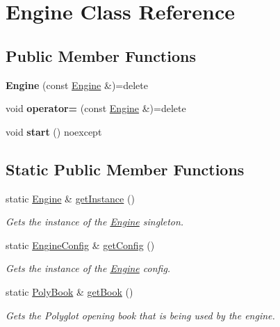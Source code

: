 \hypertarget{classEngine}{}\section{Engine Class Reference}
\label{classEngine}
\subsection*{Public Member Functions}
\begin{DoxyCompactItemize}
\item 
\mbox{\label{classEngine_ab9ee0ddff1237cf61eb482bfce9ab480}} 
{\bfseries Engine} (const \mbox{\hyperlink{classEngine}{Engine}} \&)=delete
\item 
\mbox{\label{classEngine_a5d7e8ec8383567cfe24b2b94c5730729}} 
void {\bfseries operator=} (const \mbox{\hyperlink{classEngine}{Engine}} \&)=delete
\item 
\mbox{\label{classEngine_aa78d58b978bb3c6bb147bc999e9523c1}} 
void {\bfseries start} () noexcept
\end{DoxyCompactItemize}
\subsection*{Static Public Member Functions}
\begin{DoxyCompactItemize}
\item 
static \mbox{\hyperlink{classEngine}{Engine}} \& \mbox{\hyperlink{classEngine_ae174f8fa16fbab1633489283db2b0c9f}{get\+Instance}} ()
\begin{DoxyCompactList}\small\item\em Gets the instance of the \mbox{\hyperlink{classEngine}{Engine}} singleton. \end{DoxyCompactList}\item 
static \mbox{\hyperlink{structEngineConfig}{Engine\+Config}} \& \mbox{\hyperlink{classEngine_a0829ed04a1463100784500122bbe426f}{get\+Config}} ()
\begin{DoxyCompactList}\small\item\em Gets the instance of the \mbox{\hyperlink{classEngine}{Engine}} config. \end{DoxyCompactList}\item 
static \mbox{\hyperlink{classPolyBook}{Poly\+Book}} \& \mbox{\hyperlink{classEngine_a02d2a190f06bd06f23eb6ed02474f990}{get\+Book}} ()
\begin{DoxyCompactList}\small\item\em Gets the Polyglot opening book that is being used by the engine. \end{DoxyCompactList}\end{DoxyCompactItemize}
